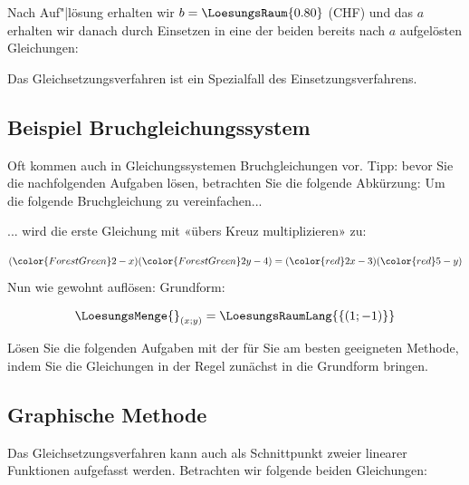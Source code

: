 Nach Auf"|lösung erhalten wir $b=\LoesungsRaum{0.80}$ (CHF) und das
$a$ erhalten wir danach durch Einsetzen in eine der beiden bereits
nach $a$ aufgelösten Gleichungen:

Das Gleichsetzungsverfahren ist ein Spezialfall des
Einsetzungsverfahrens.
\newpage

\GESO{}
\newpage

\subsection{Beispiel Bruchgleichungssystem}
Oft kommen auch in Gleichungssystemen Bruchgleichungen vor. Tipp:
bevor Sie die nachfolgenden Aufgaben lösen, betrachten Sie die folgende
Abkürzung: Um die folgende Bruchgleichung zu vereinfachen...

... wird die erste Gleichung mit «übers Kreuz multiplizieren» zu:

$$({\color{ForestGreen}2-x})({\color{ForestGreen}2y-4}) =
({\color{red}2x-3})({\color{red}5-y})$$
Nun wie gewohnt auflösen:
Grundform:

$$\LoesungsMenge{}_{(x;y)} = \LoesungsRaumLang{\{(1; -1)\}}$$

Lösen Sie die folgenden Aufgaben mit der für Sie am besten geeigneten Methode, indem Sie die
Gleichungen in der Regel zunächst in die Grundform bringen.


\newpage


\subsection{Graphische Methode}
Das Gleichsetzungsverfahren kann auch als Schnittpunkt zweier linearer Funktionen
aufgefasst werden. Betrachten wir folgende beiden Gleichungen:

